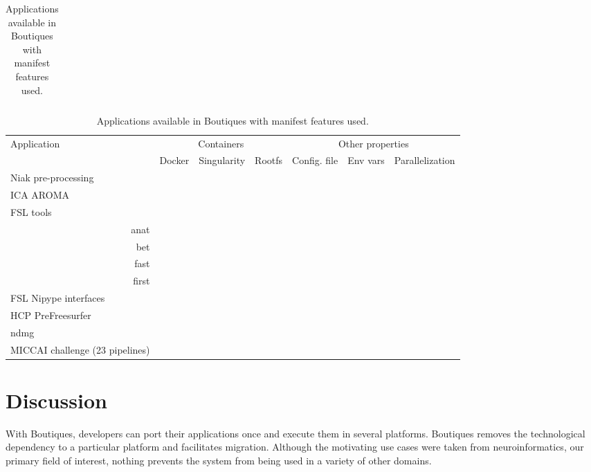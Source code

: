 \documentclass{article}
\newcommand{\boutiques}{Boutiques\xspace}
\begin{document}
\begin{table}
\begin{tabular}{l|ccccccc}
    \end{tabular}
  \vspace*{0.5cm}
  \begin{tabular}{l|ccc|ccc}
    \hline
    \rowcolor[gray]{0.9}
    Application                     &\multicolumn{3}{c|}{Containers}            &  \multicolumn{3}{c}{Other properties}  \\
    \rowcolor[gray]{0.9}
                                    &Docker              & Singularity& Rootfs  & Config. file & Env vars  & Parallelization   \\
    \hline
    Niak pre-processing             &\cellcolor{gray!75} &\cellcolor{gray!75}&         &              &\cellcolor{gray!75}&\cellcolor{gray!75}\\
    ICA AROMA                       &\cellcolor{gray!75} &            &         &              &&\\
    FSL tools &&&&&\\
    \multicolumn{1}{r|}{anat}       &                    &            &         &              &&\\
    \multicolumn{1}{r|}{bet}        &                    &            &         &              &&\\
    \multicolumn{1}{r|}{fast}       &                    &            &         &              &&\\
    \multicolumn{1}{r|}{first}      &                    &            &         &              &&\\
    FSL Nipype interfaces           &                    &            &         &              &&\\
    HCP PreFreesurfer               &\cellcolor{gray!75} &            &         &              &&\\
    ndmg                            &\cellcolor{gray!75} &\cellcolor{gray!75}&         &              &&\\
    MICCAI challenge (23 pipelines) &\cellcolor{gray!75} &            &         &              &&\\
  \end{tabular} 
  \caption{Applications available in Boutiques with manifest features used.}
  \label{table:applications}
\end{table}

\section{Discussion}
With \boutiques, developers can port their applications once and execute
them in several platforms. \boutiques removes the technological dependency to a
particular platform and facilitates migration.  Although the
motivating use cases were taken from neuroinformatics, our primary
field of interest, nothing prevents the system from being used in a
variety of other domains.
\end{document}
